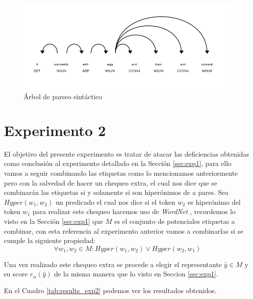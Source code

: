 \begin{figure}
\begin{center}
    \includegraphics[width=\textwidth]{images/image198.png}
    \caption{Árbol de parseo sintáctico}
    \label{fig:Syntacti_parser_exp1_bad_example}
\end{center}
\end{figure}

\section{Experimento 2} \label{sec:exp2}

El objetivo del presente experimento es tratar de atacar las deficiencias obtenidas como conclusión al experimento detallado en la Sección \ref{sec:exp1}, para ello vamos a seguir combinando las etiquetas como lo mencionamos anteriormente pero con la salvedad de hacer un chequeo extra, el cual nos dice que se combinarán las etiquetas si y solamente si son hiperónimos de a pares.
Sea $Hyper(w_{1}, w_{2})$ un predicado el cual nos dice si el token $w_{2}$ es hiperónimo del token $w_{1}$ para realizar este chequeo hacemos uso de \textit{WordNet} \cite{worNet}, recordemos lo visto en la Sección \ref{sec:exp1} que $M$ es el conjunto de potenciales etiquetas a combinar, con esta referencia al experimento anterior vamos a combinarlas si se cumple la siguiente propiedad:
\[ \forall {w_{1},w_{2} \in M : Hyper(w_{1}, w_{2}) \lor Hyper(w_{2}, w_{1})} \]

Una vez realizado este chequeo extra se procede a elegir el representante $\hat{y} \in M$ y su score $r_{\alpha}(\hat{y})$ de la misma manera que lo visto en Seccion \ref{sec:exp1}.

En el Cuadro \ref{tab:results_exp2} podemos ver los resultados obtenidos.

